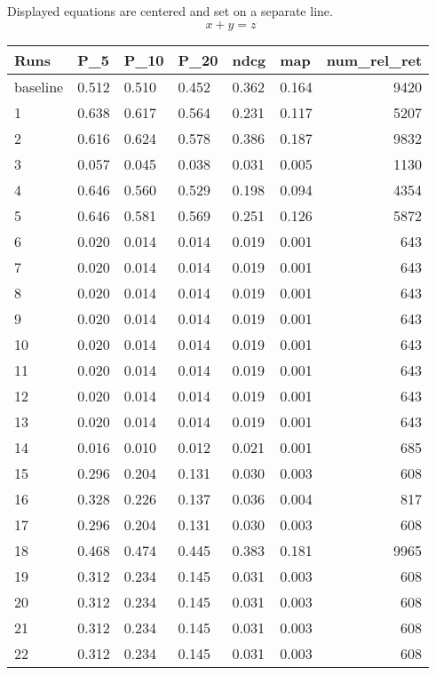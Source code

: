 \documentclass[runningheads]{llncs}
\begin{document}
\noindent Displayed equations are centered and set on a separate
line.
\begin{equation}
x + y = z
\end{equation}

\begin{tabular}{l l l l l l r}
    Runs & P\_5 & P\_10 & P\_20 & ndcg & map & num\_rel\_ret \\
    \hline
    \hline
    baseline & 0.512 & 0.510 & 0.452 & 0.362 & 0.164 & 9420 \\
    \hline
    1 & 0.638 & 0.617 & 0.564 & 0.231 & 0.117 & 5207 \\
    2 & 0.616 & 0.624 & 0.578 & 0.386 & 0.187 & 9832 \\
    3 & 0.057 & 0.045 & 0.038 & 0.031 & 0.005 & 1130 \\
    4 & 0.646 & 0.560 & 0.529 & 0.198 & 0.094 & 4354 \\
    5 & 0.646 & 0.581 & 0.569 & 0.251 & 0.126 & 5872 \\
    6 & 0.020 & 0.014 & 0.014 & 0.019 & 0.001 & 643 \\
    7 & 0.020 & 0.014 & 0.014 & 0.019 & 0.001 & 643 \\
    8 & 0.020 & 0.014 & 0.014 & 0.019 & 0.001 & 643 \\
    9 & 0.020 & 0.014 & 0.014 & 0.019 & 0.001 & 643 \\
    10 & 0.020 & 0.014 & 0.014 & 0.019 & 0.001 & 643 \\
    11 & 0.020 & 0.014 & 0.014 & 0.019 & 0.001 & 643 \\
    12 & 0.020 & 0.014 & 0.014 & 0.019 & 0.001 & 643 \\
    13 & 0.020 & 0.014 & 0.014 & 0.019 & 0.001 & 643 \\
    14 & 0.016 & 0.010 & 0.012 & 0.021 & 0.001 & 685 \\
    15 & 0.296 & 0.204 & 0.131 & 0.030 & 0.003 & 608 \\
    16 & 0.328 & 0.226 & 0.137 & 0.036 & 0.004 & 817 \\
    17 & 0.296 & 0.204 & 0.131 & 0.030 & 0.003 & 608 \\
    18 & 0.468 & 0.474 & 0.445 & 0.383 & 0.181 & 9965 \\
    19 & 0.312 & 0.234 & 0.145 & 0.031 & 0.003 & 608 \\
    20 & 0.312 & 0.234 & 0.145 & 0.031 & 0.003 & 608 \\
    21 & 0.312 & 0.234 & 0.145 & 0.031 & 0.003 & 608 \\
    22 & 0.312 & 0.234 & 0.145 & 0.031 & 0.003 & 608 \\

\end{tabular}
\end{document}

